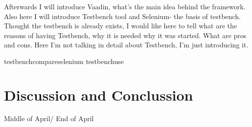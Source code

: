\documentclass[12pt,a4paper,english%
]{tutthesis}
\begin{document}
		
		Afterwards I will introduce Vaadin, what's the main idea behind the framework.
		Also here I will introduce Testbench tool and Selenium- the basis of
		testbench. Thought the testbench is already exists, I would like here to tell
		what are the reasons of having Testbench, why it is needed why it was started.
		What are pros and cons. Here I'm not talking in detail about Testbench, I'm
		just introducing it.
\fi




 {testbenchcompareselenium}
 {testbenchuse}  

 \section {Discussion and Conclussion}
 	Middle of April/ End of April
\end{document}

